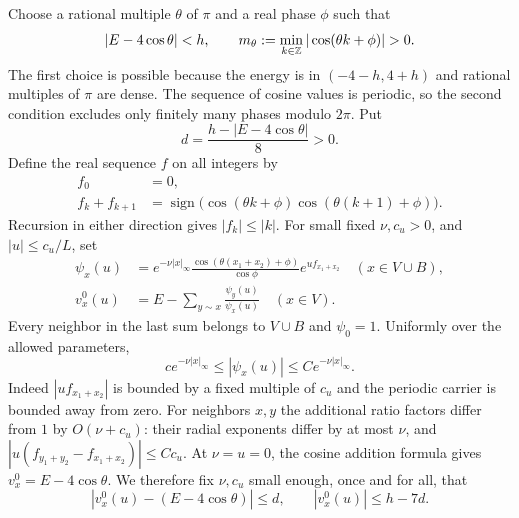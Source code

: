Choose a rational multiple $\theta$ of $\pi$ and a real phase $\phi$ such
that
\begin{equation}
 |E-4\cos\theta|<h,
 \qquad m_\theta:=\min_{k\in\Z}|\cos(\theta k+\phi)|>0.
 \label{cell:carrier}
\end{equation}
The first choice is possible because the energy is in $(-4-h,4+h)$ and
rational multiples of $\pi$ are dense.  The sequence of cosine values is
periodic, so the second condition excludes only finitely many phases
modulo $2\pi$.  Put
\[
 d=\frac{h-|E-4\cos\theta|}{8}>0.
\]
Define the real sequence $f$ on all integers by
\begin{equation}
 \begin{aligned}
 f_0&=0,\\
 f_k+f_{k+1}
  &=\operatorname{sign}\bigl(\cos(\theta k+\phi)
                  \cos(\theta(k+1)+\phi)\bigr).
 \end{aligned}
 \label{cell:recurrence}
\end{equation}
Recursion in either direction gives $|f_k|\le|k|$.
For small fixed $\nu,c_u>0$, and $|u|\le c_u/L$, set
\begin{equation}
 \begin{aligned}
 \psi_x(u)&=e^{-\nu|x|_\infty}
       \frac{\cos(\theta(x_1+x_2)+\phi)}{\cos\phi}
       e^{u f_{x_1+x_2}}\quad(x\in V\cup B),\\
 v_x^0(u)&=E-\sum_{y\sim x}\frac{\psi_y(u)}{\psi_x(u)}
       \quad(x\in V).
 \end{aligned}
 \label{cell:profile-formula}
\end{equation}
Every neighbor in the last sum belongs to $V\cup B$ and $\psi_0=1$.
Uniformly over the allowed parameters,
\begin{equation}
 c e^{-\nu|x|_\infty}\le |\psi_x(u)|
       \le C e^{-\nu|x|_\infty}.
 \label{cell:profile-size}
\end{equation}
Indeed $|u f_{x_1+x_2}|$ is bounded by a fixed multiple of $c_u$ and the
periodic carrier is bounded away from zero.  For neighbors $x,y$ the
additional ratio factors differ from $1$ by $O(\nu+c_u)$: their radial
exponents differ by at most $\nu$, and
$|u(f_{y_1+y_2}-f_{x_1+x_2})|\le Cc_u$.  At $\nu=u=0$, the cosine
addition formula gives $v_x^0=E-4\cos\theta$.  We therefore fix $\nu,c_u$
small enough, once and for all, that
\begin{equation}
 |v_x^0(u)-(E-4\cos\theta)|\le d,
 \qquad |v_x^0(u)|\le h-7d.
 \label{cell:design-margin}
\end{equation}

